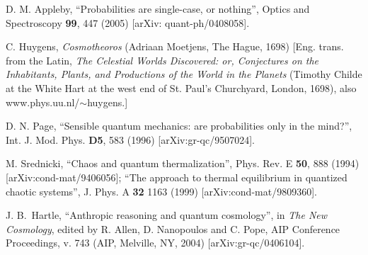 \documentclass[pra,twocolumn,nofootinbib,eqsecnum,floatfix]{revtex4}
\begin{document}
\begin{thebibliography}{99}
D. M. Appleby,
``Probabilities are single-case, or nothing'',
Optics and Spectroscopy {\bf 99}, 447 (2005)
[arXiv: quant-ph/0408058].

 C. Huygens, {\sl Cosmotheoros} (Adriaan Moetjens, The Hague, 1698) [Eng. trans. from the Latin, {\sl The Celestial Worlds Discovered: or, Conjectures on the Inhabitants, Plants, and Productions of the World in the Planets} (Timothy Childe at the White Hart at the west end of St. Paul's Churchyard, London, 1698), also www.phys.uu.nl/$\sim$huygens.]

 D. N. Page, 
``Sensible quantum mechanics: are probabilities only in the mind?'',
Int. J. Mod. Phys. {\bf D5}, 583 (1996) 
[arXiv:gr-qc/9507024].

 M. Srednicki, 
``Chaos and quantum thermalization'',
Phys. Rev. E {\bf 50}, 888 (1994) [arXiv:cond-mat/9406056];
``The approach to thermal equilibrium in quantized chaotic systems'',
J. Phys. A {\bf 32} 1163 (1999) 
[arXiv:cond-mat/9809360].

  J. B.~Hartle, 
``Anthropic reasoning and quantum cosmology'',
in {\it The New Cosmology}, 
edited by R. Allen, D. Nanopoulos and C. Pope, 
AIP Conference Proceedings, v. 743
(AIP, Melville, NY, 2004) [arXiv:gr-qc/0406104]. 

\end{thebibliography}
\end{document}
